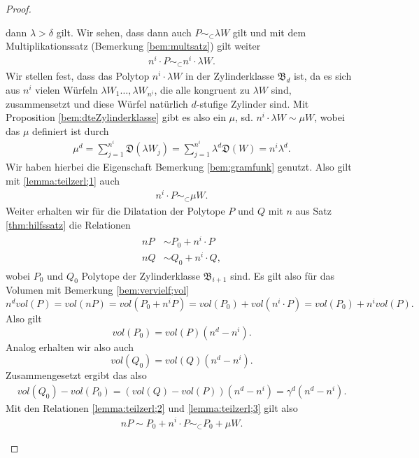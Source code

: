 \documentclass[11pt,titlepage]{article}
\theoremstyle{definition}
\theoremstyle{remark}
\begin{document}
\begin{proof}
\begin{itemize}
			dann $\lambda>\delta$ gilt. Wir sehen, dass dann auch 
			$P\sim_{\subset}\lambda W$ gilt und mit dem 
			Multiplikationssatz (Bemerkung \ref{bem:multsatz}) gilt weiter
			\begin{align}
				n^i\cdot P\sim_{\subset}n^i \cdot \lambda W.\label{lemma:teilzerl;1}
			\end{align}
			Wir stellen fest, dass das Polytop $n^i\cdot \lambda W$ 
			in der Zylinderklasse $\mathfrak{B}_d$ ist, da es sich 
			aus $n^i$ vielen Würfeln $\lambda W_1\ldots,\lambda W_{n^i}$, 
			die alle kongruent zu $\lambda W$ sind, 
			zusammensetzt und diese Würfel 
			natürlich $d$-stufige Zylinder sind. Mit Proposition 
			\ref{bem:dteZylinderklasse} gibt es also ein $\mu$, sd. 
			$n^i\cdot \lambda W\sim \mu W$, wobei das $\mu$ definiert 
			ist durch
			\begin{align}
				\mu^d =\sum_{j=1}^{n^i}\mathfrak{D}(\lambda W_j)
				=\sum_{j=1}^{n^i}\lambda^d \mathfrak{D}(W)=
				n^i\lambda^d. \label{lemma:teilzerl;5}
			\end{align}
			Wir haben hierbei die Eigenschaft Bemerkung \ref{bem:gramfunk} 
			genutzt. Also gilt mit \ref{lemma:teilzerl;1} auch
			\begin{align}
				n^i\cdot P\sim_{\subset} \mu W.\label{lemma:teilzerl;2}
			\end{align}
			Weiter erhalten wir für die Dilatation der 
			Polytope $P$ und $Q$ mit $n$ aus Satz \ref{thm:hilfssatz} 
			die Relationen
			\begin{align}
				\begin{split}
					nP&\sim P_0+ n^i\cdot P \\
					nQ&\sim Q_0+ n^i\cdot Q, \label{lemma:teilzerl;3}
				\end{split}
			\end{align}
			wobei $P_0$ und $Q_0$ Polytope der Zylinderklasse 
			$\mathfrak{B}_{i+1}$ sind. Es gilt also für das Volumen mit 
			Bemerkung \ref{bem:vervielf;vol} 
			\[n^d vol(P)=vol(nP)=vol(P_0+n^i P)=vol(P_0)+vol(n^i\cdot P)
			=vol(P_0)+n^i vol(P).\]
			Also gilt
			\[vol(P_0)=vol(P)(n^d -n^i).\]
			Analog erhalten wir also auch
			\[vol(Q_0)=vol(Q)(n^d -n^i).\]
			Zusammengesetzt ergibt das also 
			\begin{align}
				vol(Q_0)-vol(P_0)=(vol(Q)-vol(P))(n^d -n^i)=\gamma^d(n^d-n^i). \label{lemma:teilzerl;4}
			\end{align}
			Mit den Relationen \ref{lemma:teilzerl;2} und 
			\ref{lemma:teilzerl;3} gilt also 
			\begin{align}
				nP\sim P_0+n^i\cdot P \sim_{\subset} P_0 + \mu W. \label{lemma:teilzerl;7}

\end{align}
\end{itemize}
\end{proof}
\end{document}
